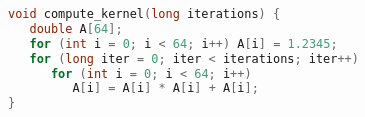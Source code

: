 \begin{lstlisting}[language=C,caption={Excerpt from compute kernel implementation.},label={lst:compute-kernel},style=codeblock,float]
void compute_kernel(long iterations) {
   double A[64];
   for (int i = 0; i < 64; i++) A[i] = 1.2345;
   for (long iter = 0; iter < iterations; iter++)
      for (int i = 0; i < 64; i++)
         A[i] = A[i] * A[i] + A[i];
}
\end{lstlisting}
